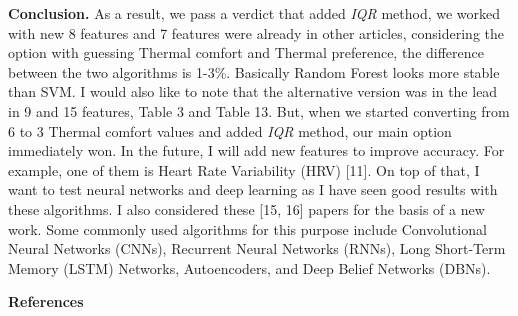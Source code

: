 \begin{multicols}{2}
{\bfseries Conclusion.} As a result, we pass a verdict that added
\emph{IQR} method, we worked with new 8 features and 7 features were
already in other articles, considering the option with guessing Thermal
comfort and Thermal preference, the difference between the two
algorithms is 1-3\%. Basically Random Forest looks more stable than SVM.
I would also like to note that the alternative version was in the lead
in 9 and 15 features, Table 3 and Table 13. But, when we started
converting from 6 to 3 Thermal comfort values and added \emph{IQR}
method, our main option immediately won. In the future, I will add new
features to improve accuracy. For example, one of them is Heart Rate
Variability (HRV) {[}11{]}. On top of that, I want to test neural
networks and deep learning as I have seen good results with these
algorithms. I also considered these {[}15, 16{]} papers for the basis of
a new work. Some commonly used algorithms for this purpose include
Convolutional Neural Networks (CNNs), Recurrent Neural Networks (RNNs),
Long Short-Term Memory (LSTM) Networks, Autoencoders, and Deep Belief
Networks (DBNs).
\end{multicols}

\begin{center}
{\bfseries References}
\end{center}

